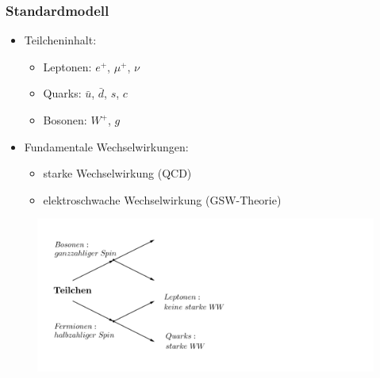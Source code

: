 \documentclass[hyperref={pdfpagelabels=false}]{beamer}
\begin{document}
\begin{frame}
 \frametitle{Standardmodell}
 \begin{minipage}[h]{0.48\textwidth}
  \begin{itemize} 
  \item Teilcheninhalt:
  \begin{itemize}
   \item Leptonen: $e^+$, $\mu^+$, $\nu$
   \item Quarks: $\bar u$, $\bar d$, $s$, $c$
   \item Bosonen: $W^+$, $g$
  \end{itemize}  
  \item Fundamentale Wechselwirkungen: 
  \begin{itemize}
   \item starke Wechselwirkung (QCD)
   \item elektroschwache Wechselwirkung (GSW-Theorie)
  \end{itemize}  
 \end{itemize}
 \end{minipage}
 \begin{minipage}[h]{0.48\textwidth}
 \begin{figure}[h]
  \includegraphics[width = 2\textwidth]{../Abbildungen/Teilchen.png}
 \end{figure}
 \end{minipage}
\end{frame}
\end{document}
